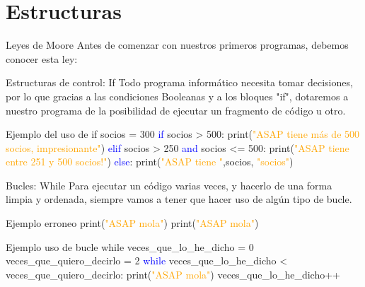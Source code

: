 \documentclass{beamer}
\begin{document}
    \section{Estructuras}
    \begin{frame}{Leyes de Moore}
    \label{moorelaw}
       Antes de comenzar con nuestros primeros programas, debemos conocer esta ley:
       
    \end{frame}
    \begin{frame}{Estructuras de control: If}
	Todo programa informático necesita tomar decisiones, por lo que gracias a las condiciones Booleanas y a los bloques "if", dotaremos a nuestro programa de la posibilidad de ejecutar un fragmento de código u otro.
	\begin{Programexample} {Ejemplo del uso de if}
		socios = 300 \newline
		\textcolor{blue}{if} socios > 500:\newline
		\hspace{3cm} print(\textcolor{orange}{"ASAP tiene más de 500 socios, impresionante"})\newline
		\textcolor{blue}{elif} socios > 250 \textcolor{blue}{and} socios <= 500:\newline
		\hspace{2cm} print(\textcolor{orange}{"ASAP tiene entre 251 y 500 socios!"})\newline
		\textcolor{blue}{else}:\newline
		\hspace{2cm} print(\textcolor{orange}{"ASAP tiene "},socios, \textcolor{orange}{"socios"})
	\end{Programexample}
	\end{frame}
	\begin{frame}{Bucles: While}
	Para ejecutar un código varias veces, y hacerlo de una forma limpia y ordenada, siempre vamos a tener que hacer uso de algún tipo de bucle.
	\begin{Programexample}{Ejemplo erroneo}
		print(\textcolor{orange}{"ASAP mola"}) \newline
		print(\textcolor{orange}{"ASAP mola"})
	\end{Programexample}
	\begin{Programexample}{Ejemplo uso de bucle while}
		veces\_que\_lo\_he\_dicho = 0 \newline
		veces\_que\_quiero\_decirlo = 2 \newline
		\textcolor{blue}{while} veces\_que\_lo\_he\_dicho < veces\_que\_quiero\_decirlo:
		\hspace{2cm} print(\textcolor{orange}{"ASAP mola"}) \newline
		\hspace{2cm} veces\_que\_lo\_he\_dicho++
		
	\end{Programexample}
\end{frame}
\end{document}
